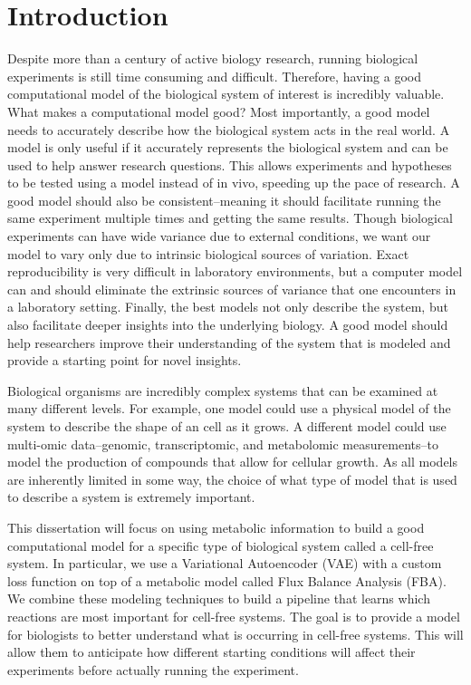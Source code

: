 \chapter{Introduction}
\setcounter{page}{1} 

Despite more than a century of active biology research, running biological experiments is still time consuming and difficult.
Therefore, having a good computational model of the biological system of interest is incredibly valuable.
What makes a computational model good?
Most importantly, a good model needs to accurately describe how the biological system acts in the real world.
A model is only useful if it accurately represents the biological system and can be used to help answer research questions.
This allows experiments and hypotheses to be tested using a model instead of in vivo, speeding up the pace of research.
A good model should also be consistent--meaning it should facilitate running the same experiment multiple times and getting the same results.
Though biological experiments can have wide variance due to external conditions, we want our model to vary only due to intrinsic biological sources of variation.
Exact reproducibility is very difficult in laboratory environments, but a computer model can and should eliminate the extrinsic sources of variance that one encounters in a laboratory setting.
Finally, the best models not only describe the system, but also facilitate deeper insights into the underlying biology.
A good model should help researchers improve their understanding of the system that is modeled and provide a starting point for novel insights.

Biological organisms are incredibly complex systems that can be examined at many different levels.
For example, one model could use a physical model of the system to describe the shape of an cell as it grows.
A different model could use multi-omic data--genomic, transcriptomic, and metabolomic measurements--to model the production of compounds that allow for cellular growth.
As all models are inherently limited in some way, the choice of what type of model that is used to describe a system is extremely important.

This dissertation will focus on using metabolic information to build a good computational model for a specific type of biological system called a cell-free system.
In particular, we use a Variational Autoencoder (VAE) with a custom loss function on top of a metabolic model called Flux Balance Analysis  (FBA).
We combine these modeling techniques to build a pipeline that learns which reactions are most important for cell-free systems.
The goal is to provide a model for biologists to better understand what is occurring in cell-free systems.
This will allow them to anticipate how different starting conditions will affect their experiments before actually running the experiment.

